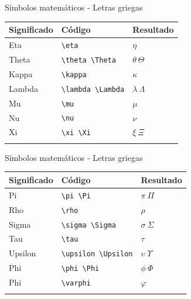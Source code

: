 \documentclass[
  ignorenonframetext,
  aspectratio=169]{beamer}
\begin{document}
\begin{frame}[fragile]{Símbolos matemáticos - Letras griegas}
\label{suxedmbolos-matemuxe1ticos---letras-griegas-1}
\begin{longtable}[]{@{}lll@{}}
\toprule\noalign{}
Significado & Código & Resultado \\
\midrule\noalign{}
\endhead
Eta & \texttt{\textbackslash{}eta} & \(\eta\) \\
Theta & \texttt{\textbackslash{}theta\ \textbackslash{}Theta} &
\(\theta\ \Theta\) \\
Kappa & \texttt{\textbackslash{}kappa} & \(\kappa\) \\
Lambda & \texttt{\textbackslash{}lambda\ \textbackslash{}Lambda} &
\(\lambda\  \Lambda\) \\
Mu & \texttt{\textbackslash{}mu} & \(\mu\) \\
Nu & \texttt{\textbackslash{}nu} & \(\nu\) \\
Xi & \texttt{\textbackslash{}xi\ \textbackslash{}Xi} & \(\xi\ \Xi\) \\
\bottomrule\noalign{}
\end{longtable}
\end{frame}

\begin{frame}[fragile]{Símbolos matemáticos - Letras griegas}
\label{suxedmbolos-matemuxe1ticos---letras-griegas-2}
\begin{longtable}[]{@{}lll@{}}
\toprule\noalign{}
Significado & Código & Resultado \\
\midrule\noalign{}
\endhead
Pi & \texttt{\textbackslash{}pi\ \textbackslash{}Pi} & \(\pi\ \Pi\) \\
Rho & \texttt{\textbackslash{}rho} & \(\rho\) \\
Sigma & \texttt{\textbackslash{}sigma\ \textbackslash{}Sigma} &
\(\sigma\ \Sigma\) \\
Tau & \texttt{\textbackslash{}tau} & \(\tau\) \\
Upsilon & \texttt{\textbackslash{}upsilon\ \textbackslash{}Upsilon} &
\(\upsilon\ \Upsilon\) \\
Phi & \texttt{\textbackslash{}phi\ \textbackslash{}Phi} &
\(\phi\ \Phi\) \\
Phi & \texttt{\textbackslash{}varphi} & \(\varphi\) \\
\bottomrule\noalign{}
\end{longtable}
\end{frame}
\end{document}
